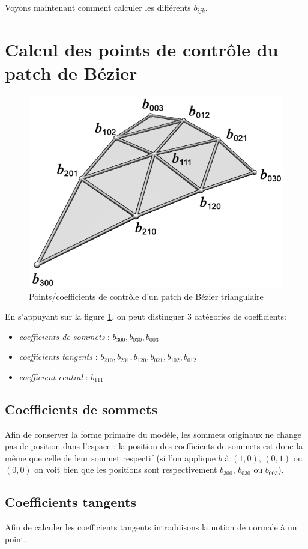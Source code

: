 \documentclass{article}
\begin{document}
Voyons maintenant comment calculer les différents $b_{ijk}$.

\section{Calcul des points de contrôle du patch de Bézier}

\begin{figure}[ht!]
\centering
    \includegraphics[width=0.4\linewidth]{control-points}
    \caption{Points/coefficients de contrôle d'un patch de Bézier triangulaire}
    \label{fig:control-points}
\end{figure}

En s'appuyant sur la figure \ref{fig:control-points}, on peut distinguer 3
catégories de coefficients:

\begin{itemize}
    \item \textit{coefficients de sommets} : $b_{300}, b_{030}, b_{003}$
    \item \textit{coefficients tangents} : $b_{210}, b_{201}, b_{120},
b_{021}, b_{102}, b_{012}$
    \item \textit{coefficient central} : $b_{111}$
\end{itemize}

\subsection{Coefficients de sommets}
Afin de conserver la forme primaire du modèle, les sommets originaux ne change
pas de position dans l'espace : la position des coefficients de sommets est
donc la même que celle de leur sommet respectif (si l'on applique $b$ à
$(1,0)$, $(0,1)$ ou $(0,0)$ on voit bien que les positions sont respectivement
$b_{300}$, $b_{030}$ ou $b_{003}$).

\subsection{Coefficients tangents}
Afin de calculer les coefficients tangents introduisons la notion de normale à
un point.
\end{document}
